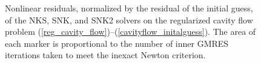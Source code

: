 \begin{figure}
  \centering
  \caption{Nonlinear residuals, normalized by the residual of the initial guess, of the NKS, SNK, and SNK2 solvers on the regularized cavity flow problem (\ref{reg_cavity_flow})--(\ref{cavityflow_initalguess}). The area of each marker is proportional to the number of inner GMRES iterations taken to meet the inexact Newton criterion.}
  \label{reg_cavity_flow_residuals}
\end{figure}

